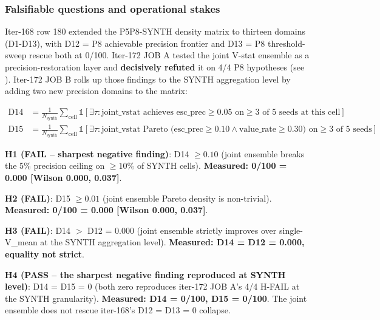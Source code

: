 
\subsubsection{Falsifiable questions and operational stakes}
Iter-168 row 180 extended the P5P8-SYNTH density matrix to thirteen
domains (D1-D13), with D12 = P8 achievable precision frontier and
D13 = P8 threshold-sweep rescue both at 0/100. Iter-172 JOB A tested
the joint V-stat ensemble as a precision-restoration layer and
\textbf{decisively refuted} it on 4/4 P8 hypotheses (see
). Iter-172 JOB B rolls up those
findings to the SYNTH aggregation level by adding two new precision
domains to the matrix:

\begin{align*}
\text{D14} &= \frac{1}{N_\text{synth}} \sum_{\text{cell}} \mathbb{1}\left[
\exists \tau : \text{joint\_vstat achieves esc\_prec} \geq 0.05
\text{ on} \geq 3 \text{ of 5 seeds at this cell}\right] \\
\text{D15} &= \frac{1}{N_\text{synth}} \sum_{\text{cell}} \mathbb{1}\left[
\exists \tau : \text{joint\_vstat Pareto (esc\_prec} \geq 0.10 \wedge
\text{value\_rate} \geq 0.30) \text{ on} \geq 3 \text{ of 5 seeds}\right]
\end{align*}

\textbf{H1 (FAIL -- sharpest negative finding)}: D14 $\geq 0.10$
(joint ensemble breaks the 5\% precision ceiling on $\geq 10\%$ of
SYNTH cells). \textbf{Measured: 0/100 = 0.000 [Wilson 0.000, 0.037]}.

\textbf{H2 (FAIL)}: D15 $\geq 0.01$ (joint ensemble Pareto density
is non-trivial). \textbf{Measured: 0/100 = 0.000 [Wilson 0.000, 0.037]}.

\textbf{H3 (FAIL)}: D14 $>$ D12 = 0.000 (joint ensemble strictly
improves over single-V\_mean at the SYNTH aggregation level).
\textbf{Measured: D14 = D12 = 0.000, equality not strict}.

\textbf{H4 (PASS -- the sharpest negative finding reproduced at
SYNTH level)}: D14 = D15 = 0 (both zero reproduces iter-172 JOB A's
4/4 H-FAIL at the SYNTH granularity). \textbf{Measured: D14 = 0/100,
D15 = 0/100}. The joint ensemble does not rescue iter-168's
D12 = D13 = 0 collapse.


